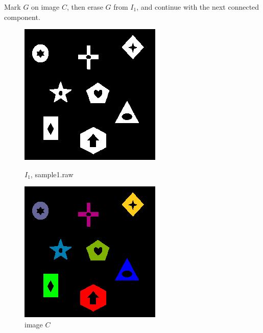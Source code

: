 \documentclass[12pt,a4paper,notitlepage,oneside,amsmath,amssymb]{article}
\begin{document}
\begin{CJK*}{UTF8}{bkai}
\begin{enumerate}[label=(\alph*)]
	      Mark \(G\) on image \(C\), then erase \(G\) from \(I_1\), and continue with the next connected component.
	      \begin{figure}[hbt!]
		      \centering
		      \begin{minipage}{.4\textwidth}
			      \centering
			      \includegraphics[width=.9\linewidth]{sample1}
			      \caption*{\(I_1\), sample1.raw}
		      \end{minipage}%
		      \begin{minipage}{.4\textwidth}
			      \centering
			      \includegraphics[width=.9\linewidth]{image_C}
			      \caption*{image \(C\)}
		      \end{minipage}
	      \end{figure}


\end{enumerate}
\end{CJK*}
\end{document}
